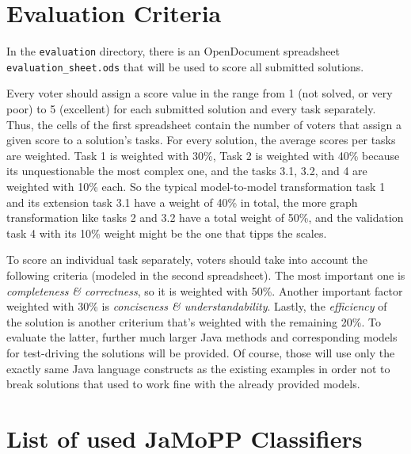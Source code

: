 \documentclass[11pt]{article}
\begin{document}
\section{Evaluation Criteria}
\label{sec:evaluation-criteria}

In the \verb|evaluation| directory, there is an OpenDocument spreadsheet
\verb|evaluation_sheet.ods| that will be used to score all submitted solutions.

Every voter should assign a score value in the range from 1 (not solved, or
very poor) to 5 (excellent) for each submitted solution and every task
separately.  Thus, the cells of the first spreadsheet contain the number of
voters that assign a given score to a solution's tasks.  For every solution,
the average scores per tasks are weighted.  Task 1 is weighted with 30\%, Task
2 is weighted with 40\% because its unquestionable the most complex one, and
the tasks 3.1, 3.2, and 4 are weighted with 10\% each.  So the typical
model-to-model transformation task 1 and its extension task 3.1 have a weight
of 40\% in total, the more graph transformation like tasks 2 and 3.2 have a
total weight of 50\%, and the validation task 4 with its 10\% weight might be
the one that tipps the scales.

To score an individual task separately, voters should take into account the
following criteria (modeled in the second spreadsheet).  The most important one
is \emph{completeness \& correctness}, so it is weighted with 50\%.  Another
important factor weighted with 30\% is \emph{conciseness \& understandability}.
Lastly, the \emph{efficiency} of the solution is another criterium that's
weighted with the remaining 20\%.  To evaluate the latter, further much larger
Java methods and corresponding models for test-driving the solutions will be
provided.  Of course, those will use only the exactly same Java language
constructs as the existing examples in order not to break solutions that used
to work fine with the already provided models.







\appendix

\section{List of used JaMoPP Classifiers}
\label{sec:list-used-jamopp}
\end{document}

